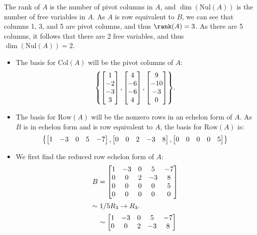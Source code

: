 \documentclass[11pt]{scrartcl}
\theoremstyle{dotlessP}
\theoremstyle{dotlessN}
\DeclarePairedDelimiter\set{\{}{\}}
\newcommand{\nul}{\text{Nul}}
\newcommand{\col}{\text{Col}}
\newcommand{\row}{\text{Row}}
\begin{document}
The rank of $A$ is the number of pivot columns in $A$, and $\dim(\nul(A))$ is the number of free variables in $A$. As $A$ is row equivalent to $B$, we can see that columns 1, 3, and 5 are pivot columns, and thus $\rank(A) = 3$. As there are 5 columns, it follows that there are 2 free variables, and thus $\dim(\nul(A)) = 2$.
\begin{itemize}
	\item The basis for $\col(A)$ will be the pivot columns of $A$: 
\[
\set*{
\begin{bmatrix}
	1 \\
	-2 \\
	-3 \\
	3
\end{bmatrix},
\begin{bmatrix}
	4 \\
	-6 \\
	-6 \\
	4
\end{bmatrix},
\begin{bmatrix}
	9 \\
	-10 \\
	-3 \\
	0
\end{bmatrix}}
.
\] 
\item The basis for $\row(A)$ will be the nonzero rows in an echelon form of $A$. As $B$ is in echelon form and is row equivalent to $A$, the basis for $\row(A)$ is: 
\[
\set*{
\begin{bmatrix}
	1 & -3 & 0 & 5 & -7 
\end{bmatrix},
\begin{bmatrix}
	0 & 0 & 2 & -3 & 8
\end{bmatrix},
\begin{bmatrix}
	0 & 0 & 0 & 0 &5
\end{bmatrix}}
\] 
\item We first find the reduced row echelon form of $A$:
	\begin{align*}
		B &=	\begin{bmatrix}
		1 & -3 & 0 & 5 & -7 \\
		0 & 0 & 2 & -3 & 8 \\
		0 & 0 & 0 & 0 & 5 \\
		0 & 0 & 0 & 0 & 0
	\end{bmatrix} \\
	\intertext{$\sim 1/5 R_3 \to R_3$.}
		  &\sim	\begin{bmatrix}
		1 & -3 & 0 & 5 & -7 \\
		0 & 0 & 2 & -3 & 8 \\

\end{bmatrix}
\end{align*}
\end{itemize}
\end{document}
